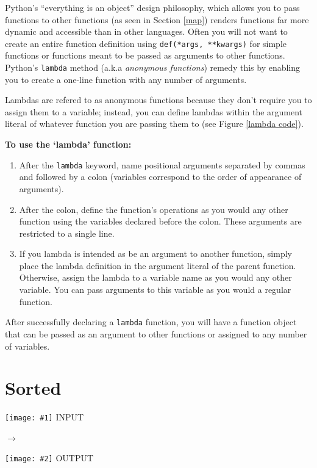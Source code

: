 \documentclass[12pt]{article}
\newcommand{\bna}[2]{
        \begin{minipage}[c]{.4\textwidth}
		\begin{center}
		\texttt{[image: \#1]}
		\textsc{INPUT}
		\end{center}
        \end{minipage}
	\begin{minipage}[c]{.1\textwidth}
		\center\LARGE$\longrightarrow$
	\end{minipage}
        \begin{minipage}[c]{.4\textwidth}
		\begin{center}
		\texttt{[image: \#2]}
		\textsc{OUTPUT}
		\end{center}
        \end{minipage}\vspace{.12in}
        }
\begin{document}
Python's ``everything is an object'' design philosophy, which allows you to pass functions to other functions (as seen in Section \ref{map}) renders functions far more dynamic and accessible than in other languages. Often you will not want to create an entire function definition using \texttt{def(*args, **kwargs)} for simple functions or functions meant to be passed as arguments to other functions. Python's \texttt{lambda} method (a.k.a \textit{anonymous functions}) remedy this by enabling you to create a one-line function with any number of arguments.

Lambdas are refered to as anonymous functions because they don't require you to assign them to a variable; instead, you can define lambdas within the argument literal of whatever function you are passing them to (see Figure \ref{lambda code}).

\vspace{1em}
\noindent
\textbf{To use the `lambda' function:}

\begin{enumerate}
	\item{After the \texttt{lambda} keyword, name positional arguments separated by commas and followed by a colon (variables correspond to the order of appearance of arguments).}
	\item{After the colon, define the function's operations as you would any other function using the variables declared before the colon. These arguments are restricted to a single line.}
	\item{If you lambda is intended as be an argument to another function, simply place the lambda definition in the argument literal of the parent function. Otherwise, assign the lambda to a variable name as you would any other variable. You can pass arguments to this variable as you would a regular function.}
\end{enumerate}

\noindent
After successfully declaring a \texttt{lambda} function, you will have a function object that can be passed as an argument to other functions or assigned to any number of variables.

\newpage
\section{Sorted}
\label{sorted}

\begin{center}
\bna{./figures/4_sorted/in_sorted.png}{./figures/4_sorted/out_sorted.png}
\end{center}
\end{document}

